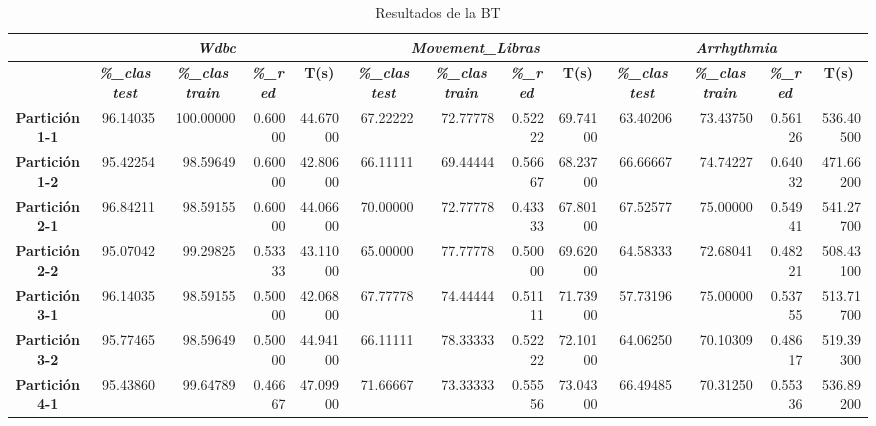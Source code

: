 \documentclass[a4paper,11pt]{article}
\begin{document}
  \begin{table}[H]	
    \caption*{Resultados de la BT}
    \begin{adjustbox}{width=1.1\textwidth}
    \begin{tabular}{|c|r|r|r|r|r|r|r|r|r|r|r|r|}
    \hline
    \multicolumn{1}{|l|}{} & \multicolumn{ 4}{c|}{\textbf{\textit{Wdbc}}} & \multicolumn{ 4}{c|}{\textbf{\textit{Movement\_Libras}}} & \multicolumn{ 4}{c|}{\textbf{\textit{Arrhythmia}}} \\ \hline
    & \multicolumn{1}{c|}{\textbf{\textit{\%\_clas test}}} & \multicolumn{1}{c|}{\textbf{\textit{\%\_clas train}}} & \multicolumn{1}{c|}{\textbf{\textit{\%\_red}}} & \multicolumn{1}{c|}{\textbf{T(s)}} & \multicolumn{1}{c|}{\textbf{\textit{\%\_clas test}}} & \multicolumn{1}{c|}{\textbf{\textit{\%\_clas train}}} & \multicolumn{1}{c|}{\textbf{\textit{\%\_red}}} & \multicolumn{1}{c|}{\textbf{T(s)}} & \multicolumn{1}{c|}{\textbf{\textit{\%\_clas test}}} & \multicolumn{1}{c|}{\textbf{\textit{\%\_clas train}}} & \multicolumn{1}{c|}{\textbf{\textit{\%\_red}}} & \multicolumn{1}{c|}{\textbf{T(s)}} \\ \hline
    \textbf{Partición 1-1} & 96.14035 & 100.00000 & 0.60000 & 44.67000 & 67.22222 & 72.77778 & 0.52222 & 69.74100 & 63.40206 & 73.43750 & 0.56126 & 536.40500 \\ \hline
    \textbf{Partición 1-2} & 95.42254 & 98.59649 & 0.60000 & 42.80600 & 66.11111 & 69.44444 & 0.56667 & 68.23700 & 66.66667 & 74.74227 & 0.64032 & 471.66200 \\ \hline
    \textbf{Partición 2-1} & 96.84211 & 98.59155 & 0.60000 & 44.06600 & 70.00000 & 72.77778 & 0.43333 & 67.80100 & 67.52577 & 75.00000 & 0.54941 & 541.27700 \\ \hline
    \textbf{Partición 2-2} & 95.07042 & 99.29825 & 0.53333 & 43.11000 & 65.00000 & 77.77778 & 0.50000 & 69.62000 & 64.58333 & 72.68041 & 0.48221 & 508.43100 \\ \hline
    \textbf{Partición 3-1} & 96.14035 & 98.59155 & 0.50000 & 42.06800 & 67.77778 & 74.44444 & 0.51111 & 71.73900 & 57.73196 & 75.00000 & 0.53755 & 513.71700 \\ \hline
    \textbf{Partición 3-2} & 95.77465 & 98.59649 & 0.50000 & 44.94100 & 66.11111 & 78.33333 & 0.52222 & 72.10100 & 64.06250 & 70.10309 & 0.48617 & 519.39300 \\ \hline
    \textbf{Partición 4-1} & 95.43860 & 99.64789 & 0.46667 & 47.09900 & 71.66667 & 73.33333 & 0.55556 & 73.04300 & 66.49485 & 70.31250 & 0.55336 & 536.89200 \\ \hline

\end{tabular}
\end{adjustbox}
\end{table}
\end{document}
